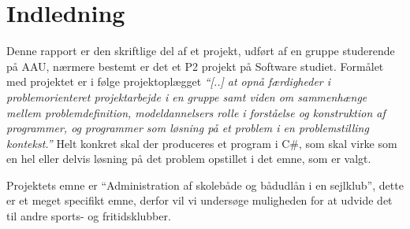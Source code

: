 \chapter{Indledning}\label{chap:indledning}



Denne rapport er den skriftlige del af et projekt, udført af en gruppe studerende på AAU, nærmere bestemt er det et P2 projekt på Software studiet. Formålet med projektet er i følge projektoplægget \textit{``[..] at opnå færdigheder i problemorienteret projektarbejde i en gruppe samt viden om sammenhænge mellem problemdefinition, modeldannelsers rolle i forståelse og konstruktion af programmer, og programmer som løsning på et problem i en problemstilling kontekst.''} Helt konkret skal der produceres et program i C\#, som skal virke som en hel eller delvis løsning på det problem opstillet i det emne, som er valgt. 

Projektets emne er ``Administration af skolebåde og bådudlån i en sejlklub'', dette er et meget specifikt emne, derfor vil vi undersøge muligheden for at udvide det til andre sports- og fritidsklubber. 

